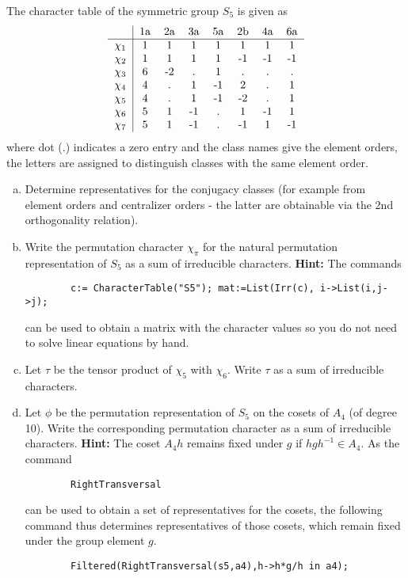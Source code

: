 \documentclass[leqno]{article}
\begin{document}
\newpage
\begin{problem}
The character table of the symmetric group $S_5$ is given as
\[
    \begin{tabular}{c|ccccccc}
        ~ & 1a & 2a & 3a & 5a & 2b & 4a & 6a \\
        \hline
        $\chi_1$ & 1 & 1 & 1 & 1 & 1 & 1 & 1\\
        $\chi_2$ & 1 & 1 & 1 & 1 & -1 & -1 & -1\\
        $\chi_3$ & 6 & -2 & . & 1 & . & . & .\\
        $\chi_4$ & 4 & . & 1 & -1 & 2 &. & 1\\
        $\chi_5$ & 4 & . & 1 & -1 & -2 & . & 1\\
        $\chi_6$ & 5 & 1 & -1 & . & 1 & -1 & 1\\
        $\chi_7$ & 5 & 1 & -1 & . & -1 & 1 & -1
    \end{tabular}
\]
where dot (.) indicates a zero entry and the class names give the element orders, the letters are assigned to distinguish classes with the same element order.
\begin{enumerate}[(a)]
    \item Determine representatives for the conjugacy classes (for example from element orders and centralizer orders - the latter are obtainable via the 2nd orthogonality relation).
    \item Write the permutation character $\chi_\pi$ for the natural permutation representation of $S_5$ as a sum of irreducible characters. \textbf{Hint:} The \GAP commands
    \begin{verbatim}
        c:= CharacterTable("S5"); mat:=List(Irr(c), i->List(i,j->j);
    \end{verbatim}
    can be used to obtain a matrix with the character values so you do not need to solve linear equations by hand.
    \item Let $\tau$ be the tensor product of $\chi_5$ with $\chi_6$. Write $\tau$ as a sum of irreducible characters.
    \item Let $\phi$ be the permutation representation of $S_5$ on the cosets of $A_4$ (of degree 10). Write the corresponding permutation character as a sum of irreducible characters. \textbf{Hint:} The coset $A_4h$ remains fixed under $g$ if $hgh^{-1}\in A_4$. As the \GAP  command \begin{verbatim}
        RightTransversal
    \end{verbatim}
    can be used to obtain a set of representatives for the cosets, the following command thus determines representatives of those cosets, which remain fixed under the group element $g$.
    \begin{verbatim}
        Filtered(RightTransversal(s5,a4),h->h*g/h in a4);
    \end{verbatim}
\end{enumerate}
\end{problem}
\end{document}
